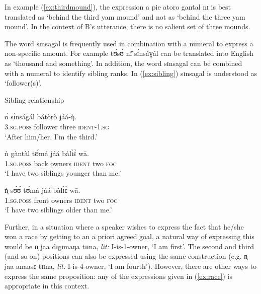\begin{exe}
\begin{exe}
\begin{exe}
{\begin{exe}
\begin{exe}
\begin{exe}
\begin{exe}
\begin{exe}
\begin{exe}
\begin{exe}
\begin{exe}
\begin{exe}
\z
\z


In example (\ref{ex:thirdmound}),  the expression {\sls a pie atoro  gantal nɪ} 
is
best translated as `behind the third yam mound' and not as `behind the three yam
mound'. In the context of B's utterance, there is no  salient set of three
mounds.  

The word  {\sls sɪnsagal} is frequently  used in combination with a numeral to
express a non-specific amount. For example  {\sls tʊ́sʊ̀ nɪ̄ sɪ́nsáɣál}  can 
be
translated into English as  `thousand and something'. In addition,  the word 
{\sls sɪnsagal} can be combined with a numeral to identify sibling ranks. In 
(\ref{ex:sibling})  {\sls sɪnsagal} is understood as `follower(s)'.  


\begin{exe}
\ex\label{ex:sibling}{\rm Sibling relationship}
\begin{xlist}

\ex\label{ex:sibling-a}
\gll ʊ̀ sɪ́nságál bátòrò jáá-ŋ̀.\\
   \textsc{3.sg.poss} {follower} {three} \textsc{ident-1.sg}\\
 \glt  `After him/her, I'm the third.'

\ex\label{ex:sibling-b}
\gll ǹ gàntàl tʊ́má jáá bàlɪ̀ɛ̀ wā.\\
 \textsc{1.sg.poss} {back} {owners} \textsc{ident}  {two}  \textsc{foc}\\
\glt   `I have two siblings younger than me.' 


\ex\label{ex:sibling-c}
\gll ǹ̩ sʊ́ʊ́ tʊ́má jáá bàlɪ̀ɛ̀ wā.\\
   \textsc{1.sg.poss} {front} {owners} \textsc{ident}  {two}  \textsc{foc}\\
 \glt  `I have two siblings older than me.'
\end{xlist}
\end{exe}



 Further, in a situation where a speaker wishes to express the fact that he/she 
won a race by getting to an a priori agreed goal, a natural way of expressing 
this would be  {\sls n̩  jaa dɪgɪmaŋa tɪɪna},  {\it lit:} I-is-1-owner,  `I am 
first'. The second and third (and so on) positions can also be expressed using 
the same construction (e.g. {\sls n̩  jaa anaasɛ tɪɪna}, {\it lit:} 
I-is-4-owner, 
 `I am fourth'). However,  there are other ways to express the same 
proposition: 
any of the expressions given in (\ref{ex:race}) is appropriate in this context.



\end{exe}
\end{exe}
\end{exe}
\end{exe}
\end{exe}
\end{exe}
\end{exe}
\end{exe}
\end{exe}}
\end{exe}
\end{exe}
\end{exe}
